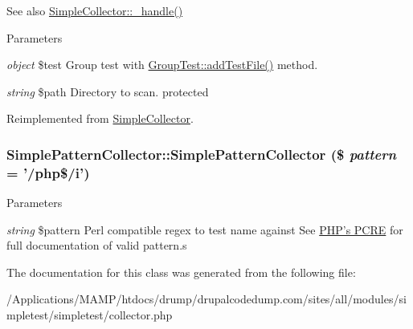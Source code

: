 \begin{DoxySeeAlso}{See also}
\hyperlink{class_simple_collector_ae243b0fe94a9437b34b1b30aa636610e}{SimpleCollector::\_\-handle()} 
\end{DoxySeeAlso}

\begin{DoxyParams}{Parameters}
\item[{\em object}]\$test Group test with \hyperlink{}{GroupTest::addTestFile()} method. \item[{\em string}]\$path Directory to scan.  protected \end{DoxyParams}


Reimplemented from \hyperlink{class_simple_collector_ae243b0fe94a9437b34b1b30aa636610e}{SimpleCollector}.\hypertarget{class_simple_pattern_collector_a8d0a4aeab51275b3bae2ddd577341fc0}{
\subsubsection[{SimplePatternCollector}]{\setlength{\rightskip}{0pt plus 5cm}SimplePatternCollector::SimplePatternCollector (\$ {\em pattern} = {\ttfamily '/php\$/i'})}}
\label{class_simple_pattern_collector_a8d0a4aeab51275b3bae2ddd577341fc0}

\begin{DoxyParams}{Parameters}
\item[{\em string}]\$pattern Perl compatible regex to test name against See \hyperlink{}{PHP's PCRE} for full documentation of valid pattern.s \end{DoxyParams}


The documentation for this class was generated from the following file:\begin{DoxyCompactItemize}
\item 
/Applications/MAMP/htdocs/drump/drupalcodedump.com/sites/all/modules/simpletest/simpletest/collector.php\end{DoxyCompactItemize}
